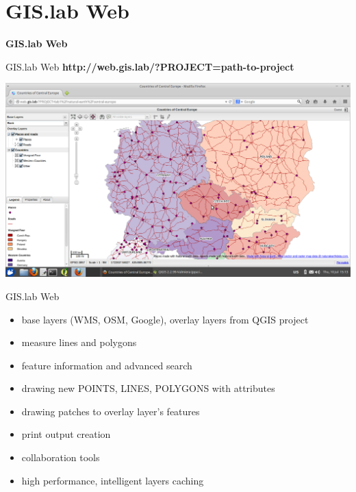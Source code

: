 \documentclass[12pt]{beamer}
\begin{document}
\section{GIS.lab Web}
\begin{frame}
	\begin{center}
		\LARGE\textbf{GIS.lab Web}
	\end{center}
\end{frame}


\begin{frame}{GIS.lab Web}
	\textbf{http://web.gis.lab/?PROJECT=path-to-project}
	\begin{center}
		\includegraphics[keepaspectratio=true,height=0.7\textheight]{images/rapid-gis-deployment/project-gislab-web.png}
	\end{center}
\end{frame}


\begin{frame}{GIS.lab Web}
	\begin{itemize}[<+->]
		\item base layers (WMS, OSM, Google), overlay layers from QGIS project
		\item measure lines and polygons
		\item feature information and advanced search
		\item drawing new POINTS, LINES, POLYGONS with attributes
		\item drawing patches to overlay layer's features
		\item print output creation
		\item collaboration tools
		\item high performance, intelligent layers caching
	\end{itemize}
\end{frame}
\end{document}
